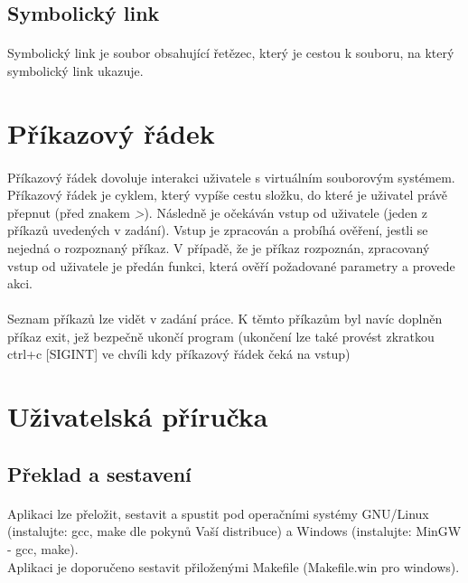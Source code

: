 \documentclass[12pt, a4paper]{article}
\begin{document}
\subsection{Symbolický link}
\paragraph{}
Symbolický link je soubor obsahující řetězec, který je cestou k souboru, na který symbolický link ukazuje. 


\newpage
\section{Příkazový řádek}
\paragraph{}
Příkazový řádek dovoluje interakci uživatele s virtuálním souborovým systémem. Příkazový řádek je cyklem, který vypíše cestu složku, do které je uživatel právě přepnut (před znakem \textit{>}). Následně je očekáván vstup od uživatele (jeden z příkazů uvedených v zadání). Vstup je zpracován a probíhá ověření, jestli se nejedná o rozpoznaný příkaz. V případě, že je příkaz rozpoznán, zpracovaný vstup od uživatele je předán funkci, která ověří požadované parametry a provede akci. 

\paragraph{}
Seznam příkazů lze vidět v zadání práce. K těmto příkazům byl navíc doplněn příkaz exit, jež bezpečně ukončí program (ukončení lze také provést zkratkou ctrl+c [SIGINT] ve chvíli kdy příkazový řádek čeká na vstup) 

\newpage
\section{Uživatelská příručka}
\subsection{Překlad a sestavení}
\paragraph{}
Aplikaci lze přeložit, sestavit a spustit pod operačními systémy GNU/Linux (instalujte: gcc, make dle pokynů Vaší distribuce) a Windows (instalujte: MinGW - gcc, make). \\ Aplikaci je doporučeno sestavit přiloženými Makefile (Makefile.win pro windows). 
\end{document}
